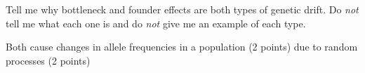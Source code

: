 \question[5]
Tell me why bottleneck and founder effects are both types of genetic drift. Do \emph{not} tell me what each one is and do \emph{not} give me an example of each type.

\begin{solution}
Both cause changes in allele frequencies in a population (2 points) due to random processes (2 points)
\end{solution}
